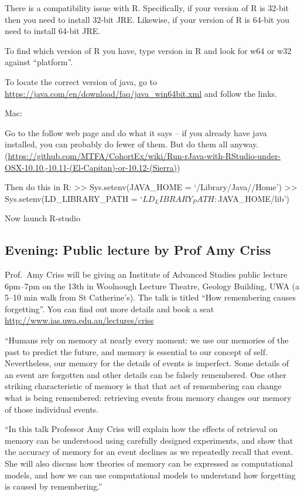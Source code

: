 \documentclass[]{article}
\begin{document}
There is a compatibility issue with R. Specifically, if your version of
R is 32-bit then you need to install 32-bit JRE. Likewise, if your
version of R is 64-bit you need to install 64-bit JRE.

To find which version of R you have, type version in R and look for w64
or w32 against ``platform''.

To locate the correct version of java, go to
\url{https://java.com/en/download/faq/java_win64bit.xml} and follow the
links.

Mac:

Go to the follow web page and do what it says -- if you already have
java installed, you can probably do fewer of them. But do them all
anyway.
(\url{https://github.com/MTFA/CohortEx/wiki/Run-rJava-with-RStudio-under-OSX-10.10,-10.11-(El-Capitan)-or-10.12-(Sierra)})

Then do this in R: \textgreater{}\textgreater{} Sys.setenv(JAVA\_HOME =
`/Library/Java//Home') \textgreater{}\textgreater{}
Sys.setenv(LD\_LIBRARY\_PATH = `\(LD_LIBRARY_PATH:\)JAVA\_HOME/lib')

Now launch R-studio

\subsection{Evening: Public lecture by Prof Amy
Criss}\label{evening-public-lecture-by-prof-amy-criss}

Prof.~Amy Criss will be giving an Institute of Advanced Studies public
lecture 6pm--7pm on the 13th in Woolnough Lecture Theatre, Geology
Building, UWA (a 5--10 min walk from St Catherine's). The talk is titled
``How remembering causes forgetting''. You can find out more details and
book a seat \url{http://www.ias.uwa.edu.au/lectures/criss}

``Humans rely on memory at nearly every moment: we use our memories of
the past to predict the future, and memory is essential to our concept
of self. Nevertheless, our memory for the details of events is
imperfect. Some details of an event are forgotten and other details can
be falsely remembered. One other striking characteristic of memory is
that that act of remembering can change what is being remembered:
retrieving events from memory changes our memory of those individual
events.

``In this talk Professor Amy Criss will explain how the effects of
retrieval on memory can be understood using carefully designed
experiments, and show that the accuracy of memory for an event declines
as we repeatedly recall that event. She will also discuss how theories
of memory can be expressed as computational models, and how we can use
computational models to understand how forgetting is caused by
remembering.''
\end{document}
